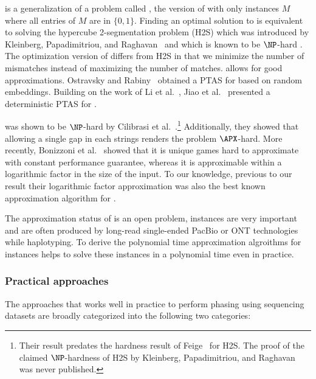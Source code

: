 \GMEC is a generalization of a problem called \BMEC, the version of \MEC with only instances $M$ where all entries of $M$ are in $\{0,1\}$.
Finding an optimal solution to \BMEC is equivalent to solving the hypercube 2-segmentation problem (H2S) which was introduced by Kleinberg, Papadimitriou, and Raghavan~\citep{KPR98_segmentation,KPR04_segmentation} and which is known to be $\NP$-hard \citep{Fei14_np,KPR04_segmentation}.
The optimization version of \BMEC  differs from H2S in that we minimize the number of mismatches instead of maximizing the number of matches.
\BMEC allows for good approximations.
Ostravsky and Rabiny~\citep{OR02_polynomial} obtained a PTAS for \BMEC based on random embeddings.
Building on the work of Li et al.~\citep{LMW02_finding}, Jiao et al.~\citep{JXL04_k} presented a deterministic PTAS for \BMEC.

\GMEC was shown to be $\NP$-hard by Cilibrasi et al.~\citep{CIKT07_complexity}.\footnote{Their result predates the hardness result of Feige~\citep{Fei14_np} for H2S. The proof of the claimed $\NP$-hardness of H2S by Kleinberg, Papadimitriou, and Raghavan~\citep{KPR98_segmentation} was never published.}
Additionally, they showed that allowing a single gap in each strings renders the problem $\APX$-hard.
More recently, Bonizzoni et al.~\citep{BDK+16_minimum} showed that it is unique games hard to approximate \MEC with constant performance guarantee, whereas it is approximable within a logarithmic factor in the size of the input. 
To our knowledge, previous to our result their logarithmic factor approximation was also the best known approximation algorithm for \GMEC.

\begin{gaps}
 The approximation status of \GMEC is an open problem, \GMEC instances are very important and are often produced by long-read single-ended PacBio or ONT technologies while haplotyping.
 To derive the polynomial time approximation algroithms for \GMEC instances helps to solve these instances in a polynomial time even in practice.
\end{gaps}


\subsubsection{Practical approaches}
The approaches that works well in practice to perform phasing using sequencing datasets are broadly categorized into the following two categories:

